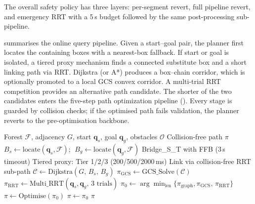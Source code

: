 \documentclass[journal]{IEEEtran}
\begin{document}
The overall safety policy has three layers: per-segment revert, full
pipeline revert, and emergency RRT with a 5\,s budget followed by the
same post-processing sub-pipeline.

 summarises the online query pipeline.
Given a start--goal pair, the planner first locates the containing
boxes with a nearest-box fallback.
If start or goal is isolated, a tiered proxy mechanism finds a
connected substitute box and a short linking path via RRT.
Dijkstra (or A*) produces a box--chain corridor, which is optionally
promoted to a local GCS convex corridor.
A multi-trial RRT competition provides an alternative path candidate.
The shorter of the two candidates enters the five-step path
optimization pipeline ().
Every stage is guarded by collision checks; if the optimised path
fails validation, the planner reverts to the pre-optimisation
backbone.

\begin{algorithm}[t]
\caption{Online Query Pipeline}\label{alg:query}
\footnotesize
\begin{algorithmic}[1]
\REQUIRE Forest $\mathcal{F}$, adjacency $G$, start $\bm{q}_s$,
  goal $\bm{q}_g$, obstacles $\mathcal{O}$
\ENSURE Collision-free path $\pi$
\STATE {}
\STATE $B_s \leftarrow \mathrm{locate}(\bm{q}_s, \mathcal{F})$;
  $\;B_g \leftarrow \mathrm{locate}(\bm{q}_g, \mathcal{F})$
  \hfill{}
  \STATE Bridge\_S\_T with FFB (3\,s timeout)
\ENDIF
\STATE {}
  \STATE Tiered proxy: Tier 1/2/3 (200/500/2000\,ms)
  \STATE Link via collision-free RRT sub-path
\ENDIF
\STATE {}
\STATE $\mathcal{C} \leftarrow \text{Dijkstra}(G,\, B_s,\, B_g)$
  \hfill{}
\STATE {}
  \STATE $\pi_{\text{GCS}} \leftarrow \text{GCS\_Solve}(\mathcal{C})$
\ENDIF
\STATE {}
\STATE $\pi_{\text{RRT}} \leftarrow
  \text{Multi\_RRT}(\bm{q}_s, \bm{q}_g,\, 3\text{ trials})$
\STATE $\pi_0 \leftarrow \arg\min_{\text{len}}\{\pi_{\text{graph}},
  \pi_{\text{GCS}},\, \pi_{\text{RRT}}\}$
\STATE {}
\STATE $\pi \leftarrow \text{Optimise}(\pi_0)$
  \hfill{}
  \STATE $\pi \leftarrow \pi_0$  \hfill{}
\ENDIF
\RETURN $\pi$
\end{algorithmic}
\end{algorithm}
\end{document}
